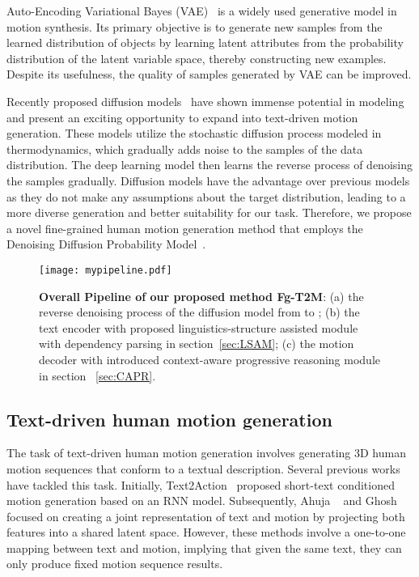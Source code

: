 \documentclass[10pt,twocolumn,letterpaper]{article}
\begin{document}
Auto-Encoding Variational Bayes (VAE)~\cite{kingma2013auto} is a widely used generative model in motion synthesis. Its primary objective is to generate new samples from the learned distribution of objects by learning latent attributes from the probability distribution of the latent variable space, thereby constructing new examples. Despite its usefulness, the quality of samples generated by VAE can be improved.

Recently proposed diffusion models~\cite{ho2020denoising,nichol2021improved,song2020denoising} have shown immense potential in modeling and present an exciting opportunity to expand into text-driven motion generation. These models utilize the stochastic diffusion process modeled in thermodynamics, which gradually adds noise to the samples of the data distribution. The deep learning model then learns the reverse process of denoising the samples gradually. Diffusion models have the advantage over previous models as they do not make any assumptions about the target distribution, leading to a more diverse generation and better suitability for our task. Therefore, we propose a novel fine-grained human motion generation method that employs the Denoising Diffusion Probability Model~\cite{ho2020denoising}.






\begin{figure*}[t]
    \centering
     \texttt{[image: mypipeline.pdf]}
    \caption{\textbf{Overall Pipeline of our proposed method Fg-T2M}: (a) the reverse denoising process of the diffusion model from  to ; (b) the text encoder with proposed linguistics-structure assisted module with dependency parsing in section~\ref{sec:LSAM}; (c) the motion decoder with introduced context-aware progressive reasoning module in section ~\ref{sec:CAPR}.}
    \label{mypipeline}
\end{figure*}
\subsection{Text-driven human motion generation}
The task of text-driven human motion generation involves generating 3D human motion sequences that conform to a textual description. Several previous works have tackled this task. Initially, Text2Action~\cite{ahn2018text2action} proposed short-text conditioned motion generation based on an RNN model. Subsequently, Ahuja \etal~\cite{ahuja2019language2pose} and Ghosh \etal \cite{ghosh2021synthesis} focused on creating a joint representation of text and motion by projecting both features into a shared latent space. However, these methods involve a one-to-one mapping between text and motion, implying that given the same text, they can only produce fixed motion sequence results.
\end{document}
